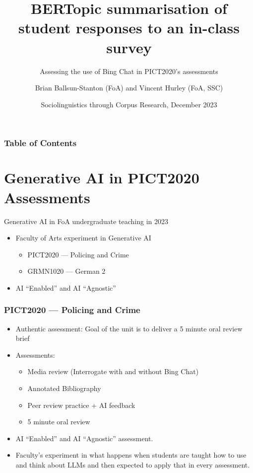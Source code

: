 \documentclass[xcolor={dvipsnames},aspectratio=169]{beamer}
\title[Berttopic] %
{BERTopic summarisation of
student responses to an in-class survey}
\subtitle{Assessing the use of Bing Chat in PICT2020's assessments}
\author[Brian Ballsun-Stanton] %
{Brian Ballsun-Stanton (FoA) and Vincent Hurley (FoA, SSC)}
\date[13 December 2023] %
{Sociolinguistics through Corpus Research, December 2023}
\begin{document}
\frame{\titlepage}


\begin{frame}
\frametitle{Table of Contents}
\tableofcontents
\end{frame}


\section{Generative AI in PICT2020 Assessments}

\begin{frame}{Generative AI in FoA undergraduate teaching in 2023}

\begin{itemize}
    \item Faculty of Arts experiment in Generative AI 
    \begin{itemize}
        \item PICT2020 --- Policing and Crime
        \item GRMN1020 --- German 2
    \end{itemize}
    \item AI ``Enabled'' and AI ``Agnostic''
\end{itemize}

\end{frame}

\begin{frame}
\frametitle{PICT2020 --- Policing and Crime}

\begin{itemize}
    \item Authentic assessment: Goal of the unit is to deliver a 5 minute oral review brief
    \item Assessments:
    \begin{itemize}
        \item Media review (Interrogate with and without Bing Chat)
        \item Annotated Bibliography
        \item Peer review practice + AI feedback
        \item 5 minute oral review
        
    \end{itemize}
    \item AI ``Enabled'' and AI ``Agnostic'' assessment.
    \item Faculty's experiment in what happens when students are taught how to use and think about LLMs and then expected to apply that in every assessment.
\end{itemize}

\end{frame}
\end{document}

